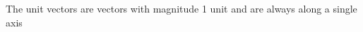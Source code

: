 \documentclass[preview]{standalone}
\begin{document}
\begin{minipage}
{8cm}The unit vectors are vectors with magnitude 1 unit and are always along a single axis
\end{minipage}
\end{document}
